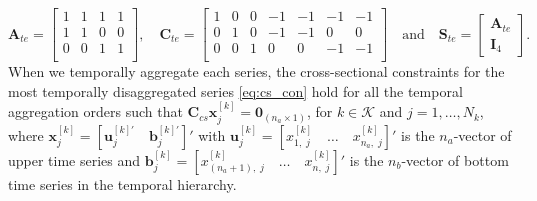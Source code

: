\documentclass[12pt]{article}
\newcommand{\bvet}{\bm{b}}
\newcommand{\uvet}{\bm{u}}
\newcommand{\xvet}{\bm{x}}
\newcommand{\Avet}{\bm{A}}
\newcommand{\Cvet}{\bm{C}}
\newcommand{\Ivet}{\bm{I}}
\newcommand{\Svet}{\bm{S}}
\newcommand{\Zerovet}{\bm{0}}
\theoremstyle{definition}
\begin{document}
$$
	\Avet_{te} = \begin{bmatrix}
		1 & 1 & 1 & 1 \\
		1 & 1 & 0 & 0 \\
		0 & 0 & 1 & 1 \\
	\end{bmatrix}, \quad \Cvet_{te} = \begin{bmatrix}
		1 & 0 & 0 & -1 & -1 & -1 & -1 \\
		0 & 1 & 0 & -1 & -1 & 0  & 0  \\
		0 & 0 & 1 & 0  & 0  & -1 & -1 \\
	\end{bmatrix} \quad \mathrm{and} \quad \Svet_{te} = \begin{bmatrix}
		\Avet_{te} \\
		\Ivet_4
	\end{bmatrix}.
$$
When we temporally aggregate each series, the cross-sectional constraints for the most temporally disaggregated series \eqref{eq:cs_con} hold for all the temporal aggregation orders such that $\Cvet_{cs}\xvet^{[k]}_j = \Zerovet_{(n_a \times 1)}$, for $k \in \mathcal{K}$ and $j = 1, \dots, N_k$, where $\xvet_j^{[k]} = \left[\uvet_j^{[k]\prime}\quad \bvet_j^{[k]\prime}\right]'$ with $\uvet^{[k]}_j = \left[ x^{[k]}_{1,\;j}\quad \dots\quad x^{[k]}_{n_a,\;j}\right]'$ is the $n_a$-vector of upper time series and $\bvet^{[k]}_j = \left[x^{[k]}_{(n_a+1),\;j}\quad\dots\quad x^{[k]}_{n,\;j}\right]'$ is the $n_b$-vector of bottom time series in the temporal hierarchy.
\end{document}
